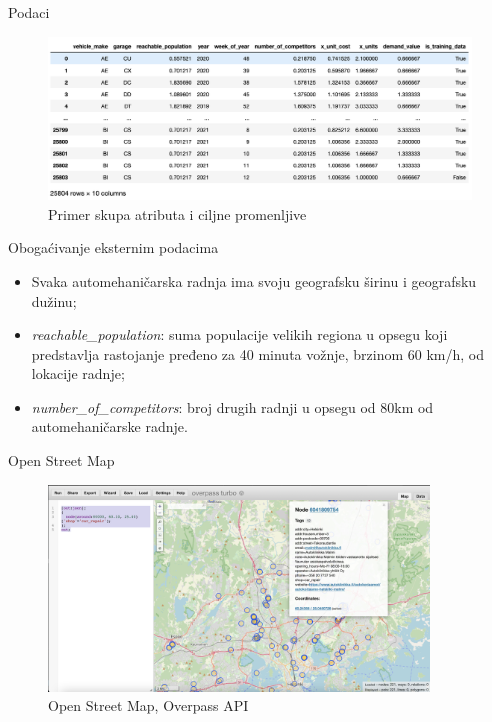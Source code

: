 \documentclass{beamer}
\begin{document}
\begin{frame}{Podaci}
    \begin{figure}
        \centering
        \includegraphics[width=1\textwidth]{images/grafici/atributi_primer.png}
        \caption{Primer skupa atributa i ciljne promenljive}
        \label{fig:primer_podataka}
    \end{figure}
\end{frame}

\begin{frame}{Obogaćivanje eksternim podacima}
\begin{itemize}
    \item Svaka automehaničarska radnja ima svoju geografsku širinu i geografsku dužinu;
    \item \textit{reachable\_population}: suma populacije velikih regiona u opsegu koji predstavlja rastojanje pređeno za 40 minuta vožnje, brzinom 60 km/h, od lokacije radnje;
    \item \textit{number\_of\_competitors}: broj drugih radnji u opsegu od 80km od automehaničarske radnje.
\end{itemize}
\end{frame}

\begin{frame}{Open Street Map}
\begin{figure}
    \centering
    \includegraphics[width=0.9\textwidth]{images/grafici/overpass_primer.png}
    \caption{Open Street Map, Overpass API}
    \label{fig:osm}
\end{figure}
\end{frame}
\end{document}
